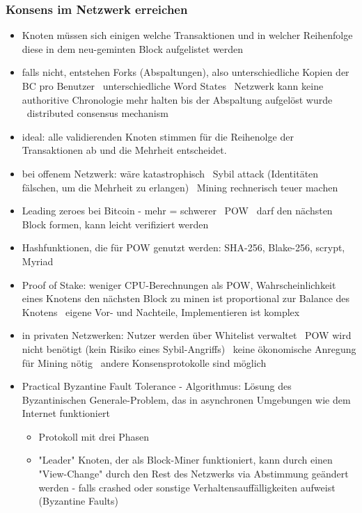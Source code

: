     \subsubsection*{Konsens im Netzwerk erreichen}
        \begin{itemize}
            \item Knoten müssen sich einigen welche Transaktionen und in welcher Reihenfolge diese in dem neu-geminten Block aufgelistet werden
            \item falls nicht, entstehen Forks (Abspaltungen), also unterschiedliche Kopien der BC pro Benutzer \textrightarrow\ unterschiedliche Word States \textrightarrow\ Netzwerk kann keine authoritive Chronologie mehr halten bis der Abspaltung aufgelöst wurde \textrightarrow\ distributed consensus mechanism
            \item ideal: alle validierenden Knoten stimmen für die Reihenolge der Transaktionen ab und die Mehrheit entscheidet.
            \item bei offenem Netzwerk: wäre katastrophisch \textrightarrow\ Sybil attack (Identitäten fälschen, um die Mehrheit zu erlangen) \textrightarrow\ Mining rechnerisch teuer machen
            \item Leading zeroes bei Bitcoin - mehr = schwerer \textrightarrow\ POW \textrightarrow\ darf den nächsten Block formen, kann leicht verifiziert werden
            \item Hashfunktionen, die für POW genutzt werden: SHA-256, Blake-256, scrypt, Myriad
            \item Proof of Stake: weniger CPU-Berechnungen als POW, Wahrscheinlichkeit eines Knotens den nächsten Block zu minen ist proportional zur Balance des Knotens \textrightarrow\ eigene Vor- und Nachteile, Implementieren ist komplex
            \item in privaten Netzwerken: Nutzer werden über Whitelist verwaltet \textrightarrow\ POW wird nicht benötigt (kein Risiko eines Sybil-Angriffs) \textrightarrow\ keine ökonomische Anregung für Mining nötig \textrightarrow\ andere Konsensprotokolle sind möglich
            \item Practical Byzantine Fault Tolerance - Algorithmus: Lösung des Byzantinischen Generale-Problem, das in asynchronen Umgebungen wie dem Internet funktioniert
                \begin{itemize}
                    \item Protokoll mit drei Phasen
                    \item "Leader" Knoten, der als Block-Miner funktioniert, kann durch einen "View-Change" durch den Rest des Netzwerks via Abstimmung geändert werden - falls crashed oder sonstige Verhaltensauffälligkeiten aufweist (Byzantine Faults)

\end{itemize}
\end{itemize}
